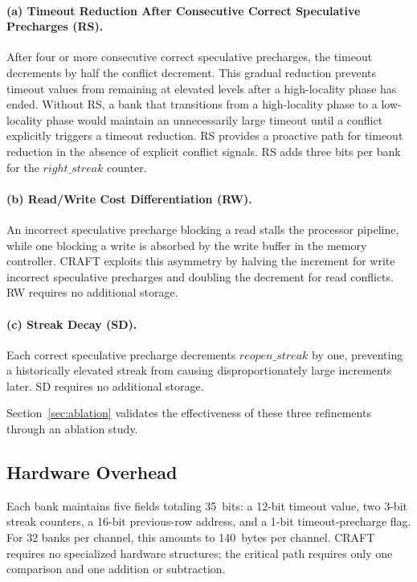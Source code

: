\documentclass[runningheads]{llncs}
\begin{document}
\paragraph{(a) Timeout Reduction After Consecutive Correct Speculative Precharges (RS).}
After four or more consecutive correct speculative precharges, the timeout decrements by half the conflict decrement.
This gradual reduction prevents timeout values from remaining at elevated levels after a high-locality phase has ended.
Without RS, a bank that transitions from a high-locality phase to a low-locality phase would maintain an unnecessarily large timeout until a conflict explicitly triggers a timeout reduction.
RS provides a proactive path for timeout reduction in the absence of explicit conflict signals.
RS adds three bits per bank for the $\mathit{right\_streak}$ counter.

\paragraph{(b) Read/Write Cost Differentiation (RW).}
An incorrect speculative precharge blocking a read stalls the processor pipeline, while one blocking a write is absorbed by the write buffer in the memory controller. CRAFT exploits this asymmetry by halving the increment for write incorrect speculative precharges and doubling the decrement for read conflicts. RW requires no additional storage.

\paragraph{(c) Streak Decay (SD).}
Each correct speculative precharge decrements $\mathit{reopen\_streak}$ by one, preventing a historically elevated streak from causing disproportionately large increments later. SD requires no additional storage.

Section~\ref{sec:ablation} validates the effectiveness of these three refinements through an ablation study.

\subsection{Hardware Overhead}
\label{sec:hardware}

Each bank maintains five fields totaling 35~bits: a 12-bit timeout value, two 3-bit streak counters, a 16-bit previous-row address, and a 1-bit timeout-precharge flag. For 32 banks per channel, this amounts to 140~bytes per channel. CRAFT requires no specialized hardware structures; the critical path requires only one comparison and one addition or subtraction.
\end{document}
